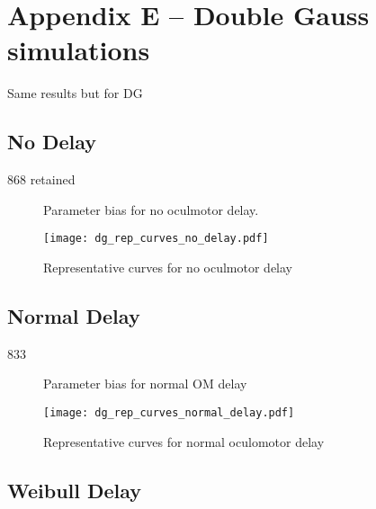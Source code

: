 \section*{Appendix E -- Double Gauss simulations}



Same results but for DG

\subsection{No Delay}

868 retained


\begin{figure}[H]
\centering
\caption{Parameter bias for no oculmotor delay. }
\label{fig:dg_par_bias_no_delay}
\end{figure}

\begin{figure}[H]
\centering
\texttt{[image: dg\_rep\_curves\_no\_delay.pdf]}
\caption{Representative curves for no oculmotor delay}
\label{fig:dg_rep_curves_no_delay}
\end{figure}


\subsection{Normal Delay}

833

\begin{figure}[H]
\centering
\caption{Parameter bias for normal OM delay}
\label{fig:dg_par_bias_normal_delay}
\end{figure}

\begin{figure}[H]
\centering
\texttt{[image: dg\_rep\_curves\_normal\_delay.pdf]}
\caption{Representative curves for normal oculomotor delay}
\label{fig:dg_rep_curves_normal_delay}
\end{figure}

\subsection{Weibull Delay}

